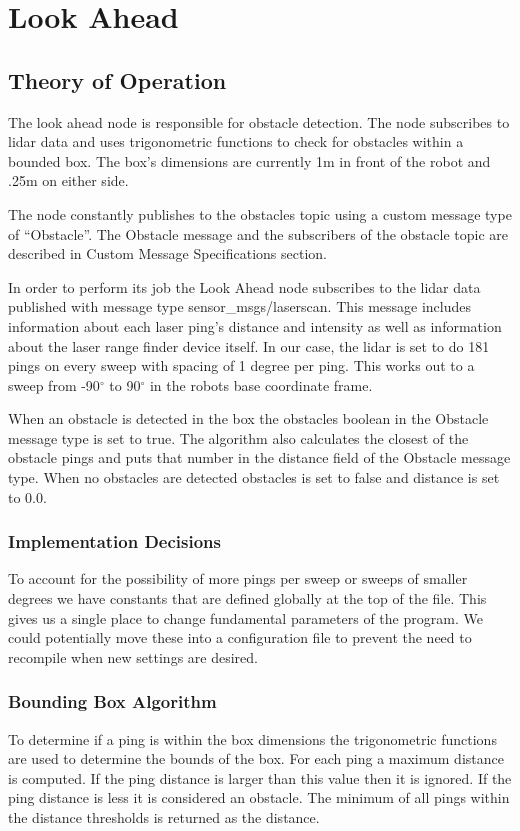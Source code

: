 \section{Look Ahead}
\subsection{Theory of Operation}

The look ahead node is responsible for obstacle detection. The node
subscribes to lidar data and uses trigonometric functions to check for
obstacles within a bounded box.  The box's dimensions are currently 1m
in front of the robot and .25m on either side. 

The node constantly publishes to the obstacles topic using a custom
message type of ``Obstacle''.  The Obstacle message and the
subscribers of the obstacle topic are described in Custom Message
Specifications section.

In order to perform its job the Look Ahead node subscribes to the
lidar data published with message type sensor\_msgs/laserscan. This message
includes information about each laser ping's distance and intensity as
well as information about the laser range finder device itself.  In
our case, the lidar is set to do 181 pings on every sweep with spacing
of 1 degree per ping.  This works out to a sweep from -90$^\circ$ to
90$^\circ$ in the robots base coordinate frame.

When an obstacle is detected in the box the obstacles boolean in the
Obstacle message type is set to true. The algorithm also calculates
the closest of the obstacle pings and puts that number in the distance field
of the Obstacle message type. When no obstacles are detected obstacles
is set to false and distance is set to 0.0.

\subsubsection{Implementation Decisions}

To account for the possibility of more pings per sweep or sweeps of
smaller degrees we have constants that are defined globally at the top
of the file.  This gives us a single place to change fundamental
parameters of the program.  We could potentially move these into a
configuration file to prevent the need to recompile when new settings
are desired.

\subsubsection{Bounding Box Algorithm}
To determine if a ping is within the box dimensions the trigonometric
functions are used to determine the bounds of the box.  For each ping
a maximum distance is computed.  If the ping distance is larger than this
value then it is ignored. If the ping distance is less it is
considered an obstacle.  The minimum of all pings within the distance
thresholds is returned as the distance.

